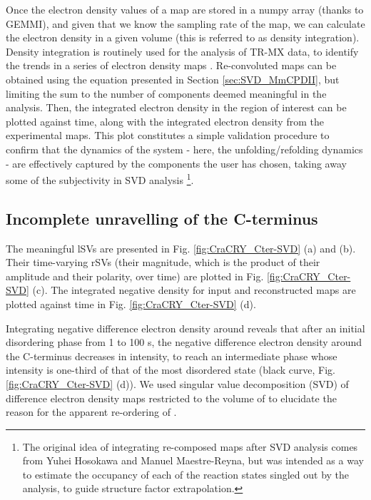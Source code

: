 Once the electron density values of a map are stored in a numpy array (thanks to GEMMI), and given that we know the sampling rate of the map, we can calculate the electron density in a given volume (this is referred to as density integration). Density integration is routinely used for the analysis of TR-MX data, to identify the trends in a series of electron density maps \parencite{wickstrandToolVisualizingProtein2020, maestre-reynaVisualizingDNARepair2023a}. Re-convoluted maps can be obtained using the equation presented in Section \ref{sec:SVD_MmCPDII}, but limiting the sum to the number of components deemed meaningful in the analysis. Then, the integrated electron density in the region of interest can be plotted against time, along with the integrated electron density from the experimental maps. This plot constitutes a simple validation procedure to confirm that the dynamics of the system - here, the unfolding/refolding dynamics - are effectively captured by the components the user has chosen, taking away some of the subjectivity in SVD analysis \footnote{The original idea of integrating re-composed maps after SVD analysis comes from Yuhei Hosokawa and Manuel Maestre-Reyna, but was intended as a way to estimate the occupancy of each of the reaction states singled out by the analysis, to guide structure factor extrapolation.}. 

\subsection{Incomplete unravelling of the C-terminus}

The meaningful lSVs are presented in Fig. \ref{fig:CraCRY_Cter-SVD} (a) and (b). Their time-varying rSVs (their magnitude, which is the product of their amplitude and their polarity, over time) are plotted in Fig. \ref{fig:CraCRY_Cter-SVD} (c).  The integrated negative density for input and reconstructed maps are plotted against time in Fig. \ref{fig:CraCRY_Cter-SVD} (d).

Integrating negative difference electron density around  reveals that after an initial disordering phase from 1 to 100 \textmu s, the negative difference electron density around the C-terminus decreases in intensity, to reach an intermediate phase whose intensity is one-third of that of the most disordered state (black curve, Fig. \ref{fig:CraCRY_Cter-SVD} (d)). We used singular value decomposition (SVD) of difference electron density maps restricted to the volume of  to elucidate the reason for the apparent re-ordering of . 


